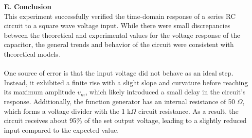 \documentclass[12pt]{article}
\begin{document}
\textbf{E. Conclusion}\\
This experiment successfully verified the time-domain response of a series RC circuit to a square wave voltage input. While there were small discrepancies between the theoretical and experimental values for the voltage response of the capacitor, the general trends and behavior of the circuit were consistent with theoretical models.\\\\
One source of error is that the input voltage did not behave as an ideal step. Instead, it exhibited a finite rise with a slight slope and curvature before reaching its maximum amplitude $v_m$, which likely introduced a small delay in the circuit's response. Additionally, the function generator has an internal resistance of 50 $\Omega$, which forms a voltage divider with the 1 k$\Omega$ circuit resistance. As a result, the circuit receives about 95\% of the set output voltage, leading to a slightly reduced input compared to the expected value.
\newpage
\end{document}
